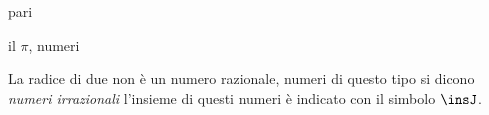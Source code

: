 pari 

il 
% 
\(\pi\), 
% 
numeri 

La radice di due non è un numero razionale, numeri di questo tipo si dicono 
\emph{numeri irrazionali} l'insieme di questi numeri è indicato con il 
simbolo \(\insJ\).

